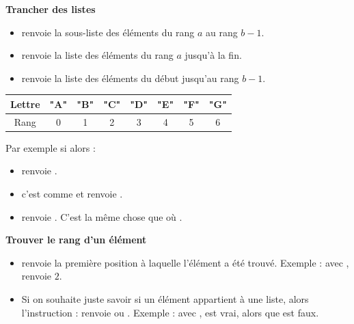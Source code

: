 \documentclass[11pt,class=report,crop=false]{standalone}
\begin{document}
\bigskip
    
\textbf{Trancher des listes}
  
  \begin{itemize}
    \item {} \quad renvoie la sous-liste des éléments du rang $a$ au rang $b-1$.
    
    \item {} \quad renvoie la liste des éléments du rang $a$ jusqu'à la fin.
      
    \item {} \quad renvoie la liste des éléments du début jusqu'au rang $b-1$.
    

\end{itemize}


\medskip
 \begin{center}
\begin{tabular}{|c||c|c|c|c|c|c|c|}
\hline
Lettre & \textbf{"A"} & \textbf{"B"} & \textbf{"C"} & \textbf{"D"} & \textbf{"E"} & \textbf{"F"} & \textbf{"G"} \\ \hline
Rang & 0 & 1 & 2 & 3 & 4 & 5 & 6 \\ \hline
\end{tabular}
\end{center}
\medskip
  
    Par exemple si  alors :
  \begin{itemize}
    \item {} \quad renvoie \ci{["B","C","D"]}.
    \item {} \quad c'est comme  et renvoie \ci{["A","B"]}.   
    \item {} \quad renvoie \ci{["E","F","G"]}.  C'est la même chose 
     que  où .
  \end{itemize} 

\bigskip

\textbf{Trouver le rang d'un élément} 

\begin{itemize}

    \item   
    renvoie la première position à laquelle l'élément a été trouvé. Exemple : avec ,
    renvoie $2$.

  \item Si on souhaite juste savoir si un élément appartient à une liste, alors l'instruction :  
  renvoie  ou .
  Exemple : avec ,
   \og{}\fg{} est vrai, alors que \og{}\fg{} est faux.
  
\end{itemize}
\end{document}

